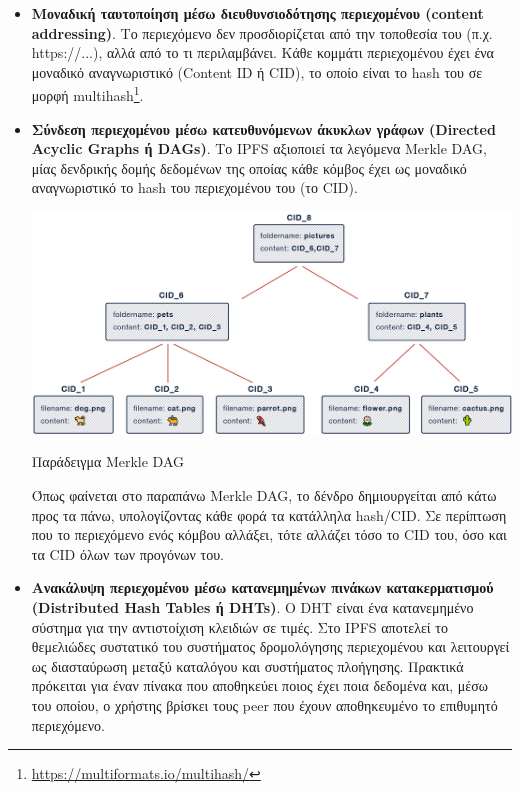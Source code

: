\begin{itemize}
	\item \textbf{Μοναδική ταυτοποίηση μέσω διευθυνσιοδότησης περιεχομένου (content addressing)}. Το περιεχόμενο δεν προσδιορίζεται από την τοποθεσία του (π.χ. https://...), αλλά από το τι περιλαμβάνει. Κάθε κομμάτι περιεχομένου έχει ένα μοναδικό αναγνωριστικό (Content ID ή CID), το οποίο είναι το hash του σε μορφή multihash\footnote{\url{https://multiformats.io/multihash/}}.
	\item \textbf{Σύνδεση περιεχομένου μέσω κατευθυνόμενων άκυκλων γράφων (Directed Acyclic Graphs ή DAGs)}. Το IPFS αξιοποιεί τα λεγόμενα Merkle DAG, μίας δενδρικής δομής δεδομένων της οποίας κάθε κόμβος έχει ως μοναδικό αναγνωριστικό το hash του περιεχομένου του (το CID).

	\vspace{-\baselineskip}
	\begin{enumitemcenteredfigure}
		\includegraphics[width=\textwidth]{assets/figures/chapter-2/2.7.merkle-dag.png}
		\caption[Παράδειγμα Merkle DAG]{Παράδειγμα Merkle DAG\footnotemark}
	\end{enumitemcenteredfigure}
	\vspace{-\baselineskip}
	
	Όπως φαίνεται στο παραπάνω Merkle DAG, το δένδρο δημιουργείται από κάτω προς τα πάνω, υπολογίζοντας κάθε φορά τα κατάλληλα hash/CID. Σε περίπτωση που το περιεχόμενο ενός κόμβου αλλάξει, τότε αλλάζει τόσο το CID του, όσο και τα CID όλων των προγόνων του.
	\item \textbf{Ανακάλυψη περιεχομένου μέσω κατανεμημένων πινάκων κατακερματισμού (\textenglish{Distributed Hash Tables ή DHTs})}. Ο DHT είναι ένα κατανεμημένο σύστημα για την αντιστοίχιση κλειδιών σε τιμές. Στο IPFS αποτελεί το θεμελιώδες συστατικό του συστήματος δρομολόγησης περιεχομένου και λειτουργεί ως διασταύρωση μεταξύ καταλόγου και συστήματος πλοήγησης. Πρακτικά πρόκειται για έναν πίνακα που αποθηκεύει ποιος έχει ποια δεδομένα και, μέσω του οποίου, ο χρήστης βρίσκει τους peer που έχουν αποθηκευμένο το επιθυμητό περιεχόμενο.
\end{itemize}

